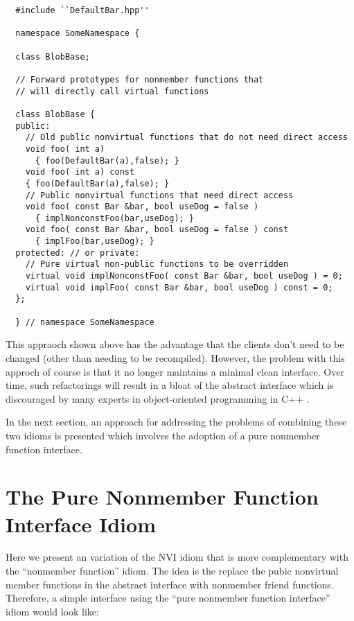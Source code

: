 \documentclass[pdf,ps2pdf,11pt]{SANDreport}
\begin{document}
{\small\begin{verbatim}
  #include ``DefaultBar.hpp''

  namespace SomeNamespace {

  class BlobBase;

  // Forward prototypes for nonmember functions that
  // will directly call virtual functions

  class BlobBase {
  public:
    // Old public nonvirtual functions that do not need direct access
    void foo( int a)
      { foo(DefaultBar(a),false); }
    void foo( int a) const
    { foo(DefaultBar(a),false); }
    // Public nonvirtual functions that need direct access
    void foo( const Bar &bar, bool useDog = false )
      { implNonconstFoo(bar,useDog); }
    void foo( const Bar &bar, bool useDog = false ) const
      { implFoo(bar,useDog); }
  protected: // or private:
    // Pure virtual non-public functions to be overridden
    virtual void implNonconstFoo( const Bar &bar, bool useDog ) = 0;
    virtual void implFoo( const Bar &bar, bool useDog ) const = 0;
  };

  } // namespace SomeNamespace
\end{verbatim}}

This appraoch shown above has the advantage that the clients don't need to be
changed (other than needing to be recompiled).  However, the problem with this
approch of course is that it no longer maintains a minimal clean interface.
Over time, such refactorings will result in a bloat of the abstract interface
which is discouraged by many experts in object-oriented programming in C++
{}\cite[Item 33]{C++CodingStandards05}.

In the next section, an approach for addressing the problems of combining
these two idioms is presented which involves the adoption of a pure nonmember
function interface.

%
\section{The Pure Nonmember Function Interface Idiom}
%

Here we present an variation of the NVI idiom that is more complementary with
the ``nonmember function'' idiom.  The idea is the replace the pubic
nonvirtual member functions in the abstract interface with nonmember friend
functions.  Therefore, a simple interface using the ``pure nonmember function
interface'' idiom would look like:
\end{document}
